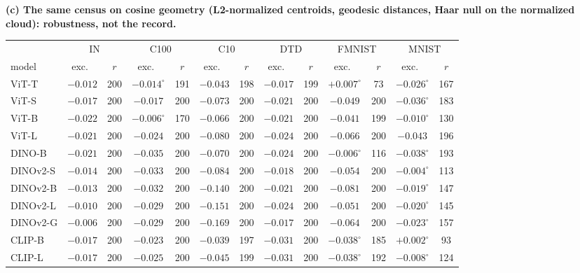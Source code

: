 \begin{table}[tbp]\ContinuedFloat
\centering
\scriptsize
\setlength{\tabcolsep}{1.4pt}
\begingroup
\noindent\textbf{(c) The same census on cosine geometry (L2-normalized centroids, geodesic distances, Haar null on the normalized cloud): robustness, not the record.}\par\vspace{1.5pt}
\setlength{\tabcolsep}{2.4pt}
\begin{tabular}{lcccccccccccc}
\toprule
 & \multicolumn{2}{c}{IN} & \multicolumn{2}{c}{C100} & \multicolumn{2}{c}{C10} & \multicolumn{2}{c}{DTD} & \multicolumn{2}{c}{FMNIST} & \multicolumn{2}{c}{MNIST} \\
model & exc.\ & $r$ & exc.\ & $r$ & exc.\ & $r$ & exc.\ & $r$ & exc.\ & $r$ & exc.\ & $r$ \\
\midrule
ViT-T & $-0.012$ & 200 & $-0.014^{\circ}$ & 191 & $-0.043$ & 198 & $-0.017$ & 199 & $+0.007^{\circ}$ & 73 & $-0.026^{\circ}$ & 167 \\
ViT-S & $-0.017$ & 200 & $-0.017$ & 200 & $-0.073$ & 200 & $-0.021$ & 200 & $-0.049$ & 200 & $-0.036^{\circ}$ & 183 \\
ViT-B & $-0.022$ & 200 & $-0.006^{\circ}$ & 170 & $-0.066$ & 200 & $-0.021$ & 200 & $-0.041$ & 199 & $-0.010^{\circ}$ & 130 \\
ViT-L & $-0.021$ & 200 & $-0.024$ & 200 & $-0.080$ & 200 & $-0.024$ & 200 & $-0.066$ & 200 & $-0.043$ & 196 \\
\midrule
DINO-B & $-0.021$ & 200 & $-0.035$ & 200 & $-0.070$ & 200 & $-0.024$ & 200 & $-0.006^{\circ}$ & 116 & $-0.038^{\circ}$ & 193 \\
DINOv2-S & $-0.014$ & 200 & $-0.033$ & 200 & $-0.084$ & 200 & $-0.018$ & 200 & $-0.054$ & 200 & $-0.004^{\circ}$ & 113 \\
DINOv2-B & $-0.013$ & 200 & $-0.032$ & 200 & $-0.140$ & 200 & $-0.021$ & 200 & $-0.081$ & 200 & $-0.019^{\circ}$ & 147 \\
DINOv2-L & $-0.010$ & 200 & $-0.029$ & 200 & $-0.151$ & 200 & $-0.024$ & 200 & $-0.051$ & 200 & $-0.020^{\circ}$ & 145 \\
DINOv2-G & $-0.006$ & 200 & $-0.029$ & 200 & $-0.169$ & 200 & $-0.017$ & 200 & $-0.064$ & 200 & $-0.023^{\circ}$ & 157 \\
\midrule
CLIP-B & $-0.017$ & 200 & $-0.023$ & 200 & $-0.039$ & 197 & $-0.031$ & 200 & $-0.038^{\circ}$ & 185 & $+0.002^{\circ}$ & 93 \\
CLIP-L & $-0.017$ & 200 & $-0.025$ & 200 & $-0.045$ & 199 & $-0.031$ & 200 & $-0.038^{\circ}$ & 192 & $-0.008^{\circ}$ & 124 \\

\end{tabular}
\end{table}
